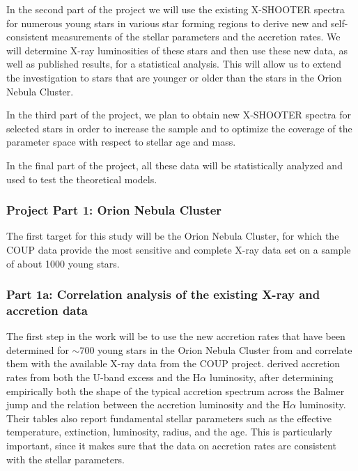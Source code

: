 \documentclass[10pt,fleqn,twoside]{article}
\begin{document}
In the second part of the project we will use the existing X-SHOOTER spectra for
numerous young stars
in various star forming regions to derive new and self-consistent 
measurements of the
stellar parameters and the accretion rates. 
We will determine X-ray luminosities of these stars and then
use these new data,
as well as published results, for a  statistical analysis.
This will allow us to extend the investigation to stars that are
younger or older than the stars in the Orion Nebula Cluster.


\smallskip

In the third part of the project, we plan to obtain new 
X-SHOOTER spectra for selected stars in order to increase the sample
and to optimize the coverage of the parameter space with respect
to stellar age and mass.

\smallskip

In the final part of the project,
all these data will be statistically analyzed and
used to test the theoretical models.


\subsubsection*{Project Part 1: Orion Nebula Cluster}



The first target for this study will be the Orion Nebula Cluster,
for which the COUP data provide the most sensitive and complete
X-ray data set on a sample of about 1000 young stars.

\subsubsection*{Part 1a: Correlation analysis of the existing X-ray and accretion data}

The first step in the work will be to use the new accretion rates
that have been  determined for $\sim 700$ young stars
in the Orion Nebula Cluster from \citet{Manara12} and correlate them
with the available X-ray data from the COUP project.
%
\citet{Manara12} derived accretion rates from both the U-band excess and the H$\alpha$ luminosity,
after determining empirically both the shape of the typical accretion spectrum across the
Balmer jump and the relation between the accretion luminosity and the  
H$\alpha$ luminosity.
Their tables also report fundamental stellar parameters such as the
effective temperature, extinction, luminosity, radius, and the age. This is
particularly important, since it makes sure that the data on accretion rates are
consistent with the stellar parameters.
\end{document}
